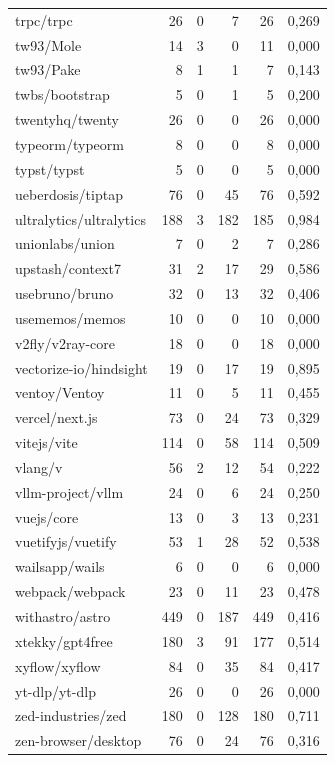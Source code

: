 \begin{tabular}{lrrrrr}
trpc/trpc & 26 & 0 & 7 & 26 & 0,269 \\
tw93/Mole & 14 & 3 & 0 & 11 & 0,000 \\
tw93/Pake & 8 & 1 & 1 & 7 & 0,143 \\
twbs/bootstrap & 5 & 0 & 1 & 5 & 0,200 \\
twentyhq/twenty & 26 & 0 & 0 & 26 & 0,000 \\
typeorm/typeorm & 8 & 0 & 0 & 8 & 0,000 \\
typst/typst & 5 & 0 & 0 & 5 & 0,000 \\
ueberdosis/tiptap & 76 & 0 & 45 & 76 & 0,592 \\
ultralytics/ultralytics & 188 & 3 & 182 & 185 & 0,984 \\
unionlabs/union & 7 & 0 & 2 & 7 & 0,286 \\
upstash/context7 & 31 & 2 & 17 & 29 & 0,586 \\
usebruno/bruno & 32 & 0 & 13 & 32 & 0,406 \\
usememos/memos & 10 & 0 & 0 & 10 & 0,000 \\
v2fly/v2ray-core & 18 & 0 & 0 & 18 & 0,000 \\
vectorize-io/hindsight & 19 & 0 & 17 & 19 & 0,895 \\
ventoy/Ventoy & 11 & 0 & 5 & 11 & 0,455 \\
vercel/next.js & 73 & 0 & 24 & 73 & 0,329 \\
vitejs/vite & 114 & 0 & 58 & 114 & 0,509 \\
vlang/v & 56 & 2 & 12 & 54 & 0,222 \\
vllm-project/vllm & 24 & 0 & 6 & 24 & 0,250 \\
vuejs/core & 13 & 0 & 3 & 13 & 0,231 \\
vuetifyjs/vuetify & 53 & 1 & 28 & 52 & 0,538 \\
wailsapp/wails & 6 & 0 & 0 & 6 & 0,000 \\
webpack/webpack & 23 & 0 & 11 & 23 & 0,478 \\
withastro/astro & 449 & 0 & 187 & 449 & 0,416 \\
xtekky/gpt4free & 180 & 3 & 91 & 177 & 0,514 \\
xyflow/xyflow & 84 & 0 & 35 & 84 & 0,417 \\
yt-dlp/yt-dlp & 26 & 0 & 0 & 26 & 0,000 \\
zed-industries/zed & 180 & 0 & 128 & 180 & 0,711 \\
zen-browser/desktop & 76 & 0 & 24 & 76 & 0,316 \\
\hline
\end{tabular}

